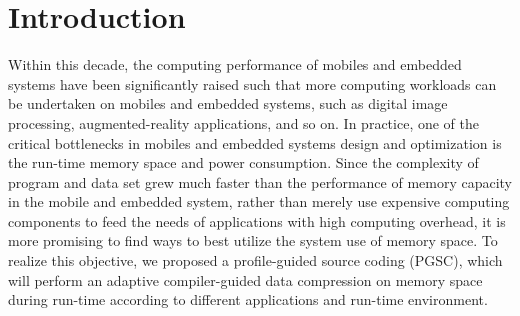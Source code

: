 \documentclass[]{article}
\begin{document}
\maketitle

\begin{abstract}

\end{abstract}

\section{Introduction}
Within this decade, the computing performance of mobiles and embedded systems have been significantly raised such that more computing workloads can be undertaken on mobiles and embedded systems, such as digital image processing, augmented-reality applications, and so on. In practice, one of the critical bottlenecks in mobiles and embedded systems design and optimization is the run-time memory space and power consumption. Since the complexity of program and data set grew much faster than the performance of memory capacity in the mobile and embedded system, rather than merely use expensive computing components to feed the needs of applications with high computing overhead, it is more promising to find ways to best utilize the system use of memory space. To realize this objective, we proposed a profile-guided source coding (PGSC), which will perform an adaptive compiler-guided data compression on memory space during run-time according to different applications and run-time environment. \par 
\end{document}
